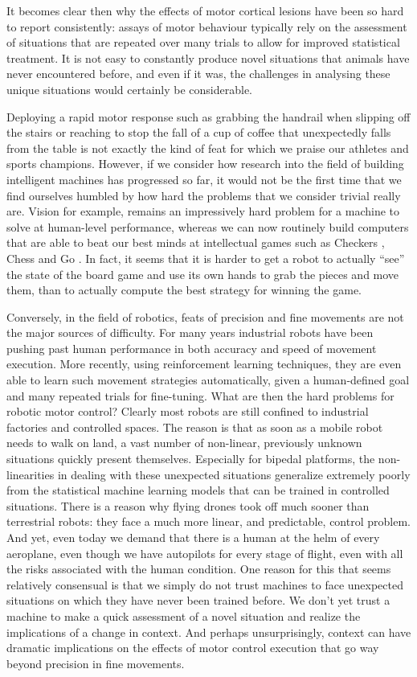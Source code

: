 It becomes clear then why the effects of motor cortical lesions have been so hard to report consistently: assays of motor behaviour typically rely on the assessment of situations that are repeated over many trials to allow for improved statistical treatment. It is not easy to constantly produce novel situations that animals have never encountered before, and even if it was, the challenges in analysing these unique situations would certainly be considerable.

Deploying a rapid motor response such as grabbing the handrail when slipping off the stairs or reaching to stop the fall of a cup of coffee that unexpectedly falls from the table is not exactly the kind of feat for which we praise our athletes and sports champions. However, if we consider how research into the field of building intelligent machines has progressed so far, it would not be the first time that we find ourselves humbled by how hard the problems that we consider trivial really are. Vision for example, remains an impressively hard problem for a machine to solve at human-level performance, whereas we can now routinely build computers that are able to beat our best minds at intellectual games such as Checkers \cite{Samuel1959}, Chess \cite{Lai2015} and Go \cite{Silver2016}. In fact, it seems that it is harder to get a robot to actually ``see'' the state of the board game and use its own hands to grab the pieces and move them, than to actually compute the best strategy for winning the game.

Conversely, in the field of robotics, feats of precision and fine movements are not the major sources of difficulty. For many years industrial robots have been pushing past human performance in both accuracy and speed of movement execution. More recently, using reinforcement learning techniques, they are even able to learn such movement strategies automatically, given a human-defined goal and many repeated trials for fine-tuning. What are then the hard problems for robotic motor control? Clearly most robots are still confined to industrial factories and controlled spaces. The reason is that as soon as a mobile robot needs to walk on land, a vast number of non-linear, previously unknown situations quickly present themselves. Especially for bipedal platforms, the non-linearities in dealing with these unexpected situations generalize extremely poorly from the statistical machine learning models that can be trained in controlled situations. There is a reason why flying drones took off much sooner than terrestrial robots: they face a much more linear, and predictable, control problem. And yet, even today we demand that there is a human at the helm of every aeroplane, even though we have autopilots for every stage of flight, even with all the risks associated with the human condition. One reason for this that seems relatively consensual is that we simply do not trust machines to face unexpected situations on which they have never been trained before. We don't yet trust a machine to make a quick assessment of a novel situation and realize the implications of a change in context. And perhaps unsurprisingly, context can have dramatic implications on the effects of motor control execution that go way beyond precision in fine movements.

